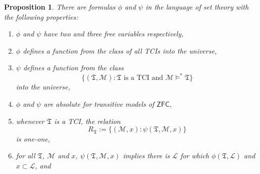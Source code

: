 \documentclass[12pt, twoside]{memoir}
\numberwithin{equation}{section}
\newtheorem{prop}[thm]{Proposition}
\theoremstyle{definition}
\theoremstyle{remark}
\theoremstyle{definition}
\theoremstyle{definition}
\theoremstyle{definition}
\theoremstyle{remark}
\begin{document}
\begin{prop}\label{prop322}
There are formulas $\phi$ and $\psi$ in the language of set theory with the following properties: 
\begin{enumerate}[label=(\arabic*)]
    \item $\phi$ and $\psi$ have two and three free variables respectively,
    \item $\phi$ defines a function from the class of all TCIs into the universe,
    \item $\psi$ defines a function from the class
    \begin{equation*}
        \{(\mathfrak{T}, \mathcal{M}) : \mathfrak{T} \text{ is a TCI and } \mathcal{M} \models^* \mathfrak{T}\}
    \end{equation*}
    into the universe,
    \item $\phi$ and $\psi$ are absolute for transitive models of $\mathsf{ZFC}$,
    \item\label{3245} whenever $\mathfrak{T}$ is a TCI, the relation
    \begin{equation*}
        R_{\mathfrak{T}} := \{(\mathcal{M}, x) : \psi(\mathfrak{T}, \mathcal{M}, x)\}
    \end{equation*}
    is one-one, 
    \item\label{3246} for all $\mathfrak{T}$, $\mathcal{M}$ and $x$, $\psi(\mathfrak{T}, \mathcal{M}, x)$ implies there is $\mathcal{L}$ for which $\phi(\mathfrak{T}, \mathcal{L})$ and $x \subset \mathcal{L}$, and
\end{enumerate}
\end{prop}
\end{document}
